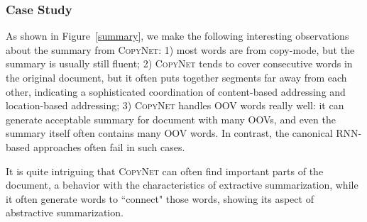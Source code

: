  \subsubsection{Case Study}
As shown in Figure~\ref{summary},  we make the following interesting observations about the summary from \textsc{CopyNet}: 1) most words  are from copy-mode, but the summary is usually still fluent; 2) \textsc{CopyNet} tends to cover consecutive words in the original document, but it often puts together segments far away from each other, indicating a sophisticated coordination of content-based addressing and location-based addressing; 3) \textsc{CopyNet} handles OOV words really well: it can generate acceptable summary for document with many OOVs, and even the summary itself often contains many OOV words. In contrast, the canonical RNN-based approaches often fail in such cases.

It is quite intriguing that \textsc{CopyNet} can often find important parts of the document, a behavior with the characteristics of extractive summarization, while it often  generate words to ``connect" those words, showing its aspect of abstractive summarization. %


